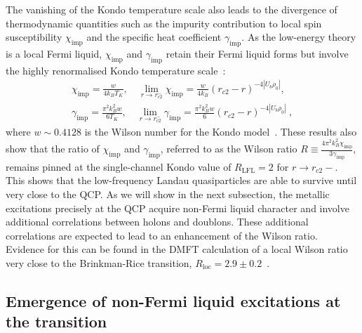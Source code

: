 The vanishing of the Kondo temperature scale also leads to the divergence of thermodynamic quantities such as the impurity contribution to local spin susceptibility \(\chi_\text{imp}\) and the specific heat coefficient \(\gamma_\text{imp}\). As the low-energy theory is a local Fermi liquid, \(\chi_\text{imp}\) and \(\gamma_\text{imp}\) retain their Fermi liquid forms but involve the highly renormalised Kondo temperature scale~\cite{wilson1975,hewson_1993_prl}:
\begin{eqnarray}
	\chi_\text{imp} = \frac{w}{4k_B T_K}, \quad\lim_{r \to r_{c2}^-}\chi_\text{imp} = \frac{w}{4k_B}\left(r_{c2} - r\right)^{-4|U_b\rho_0|}, \nonumber\\
	\gamma_\text{imp} = \frac{\pi^2 k_B^2 w}{6 T_K}, \quad \lim_{r \to r_{c2}^-}\gamma_\text{imp} = \frac{\pi^2 k_B^2 w}{6}\left(r_{c2} - r\right)^{-4|U_b\rho_0|}~,
\end{eqnarray}
where \(w \sim 0.4128\) is the Wilson number for the Kondo model~\cite{wilson1975,anirban_kondo}. These results also show that the ratio of \(\chi_\text{imp}\) and \(\gamma_\text{imp}\), referred to as the Wilson ratio \(R \equiv \frac{4\pi^2 k_B^2 \chi_\text{imp}}{3 \gamma_\text{imp}}\), remains pinned at the single-channel Kondo value of \(R_\text{LFL} = 2\) for \(r \to r_{c2}-\). This shows that the low-frequency Landau quasiparticles are able to survive until very close to the QCP. As we will show in the next subsection, the metallic excitations precisely at the QCP acquire non-Fermi liquid character and involve additional correlations between holons and doublons. These additional correlations are expected to lead to an enhancement of the Wilson ratio. Evidence for this can be found in the DMFT calculation of a local Wilson ratio very close to the Brinkman-Rice transition, \(R_\text{loc} = 2.9 \pm 0.2\)~\cite{georges1996}.

\subsection{Emergence of non-Fermi liquid excitations at the transition}

